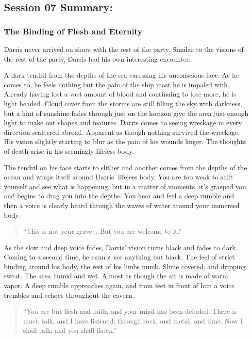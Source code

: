 \subsection{Session 07 Summary: }

\subsubsection{The Binding of Flesh and Eternity}

Darris never arrived on shore with the rest of the party. Similar to the visions of the rest of the party, Darris had his own interesting encounter.

A dark tendril from the depths of the sea caressing his unconscious face. As he comes to, he feels nothing but the pain of the ship mast he is impaled with. Already having lost a vast amount of blood and continuing to lose more, he is light headed. Cloud cover from the storms are still filling the sky with darkness, but a hint of sunshine fades through just on the horizon give the area just enough light to make out shapes and features. Darris comes to seeing wreckage in every direction scattered abroad. Apparent as though nothing survived the wreckage. His vision slightly starting to blur as the pain of his wounds linger. The thoughts of death arise in his seemingly lifeless body.

The tendril on his face starts to slither and another comes from the depths of the ocean and wraps itself around Darris' lifeless body. You are too weak to shift yourself and see what is happening, but in a matter of moments, it's grasped you and begins to drag you into the depths. You hear and feel a deep rumble and then a voice is clearly heard through the waves of water around your immersed body.

\begin{quote}
	``This is not your grave... But you are welcome to it.''
\end{quote}

As the slow and deep voice fades, Darris' vision turns black and fades to dark. Coming to a second time, he cannot see anything but black. The feel of strict binding around his body, the rest of his limbs numb. Slime covered, and dripping sweat. The area humid and wet. Almost as though the air is made of warm vapor. A deep rumble approaches again, and from feet in front of him a voice trembles and echoes throughout the cavern. 

\begin{quote}
	``You are but flesh and faith, and your mind has been deluded. There is much talk, and I have listened, through rock, and metal, and time. Now I shall talk, and you shall listen.''
\end{quote}